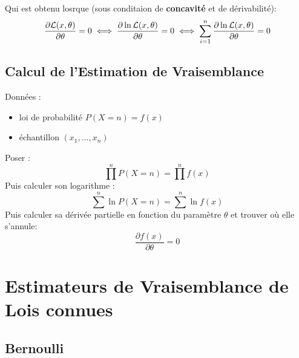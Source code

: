 \documentclass{article}
\begin{document}
Qui est obtenu losrque (sous conditaion de \textbf{concavité} et de dérivabilité):
\begin{equation}
    \frac{\partial {\cal L}(x, \theta)}{\partial \theta} = 0
    \iff \frac{\partial \ln{\cal L}(x, \theta)}{\partial \theta} = 0
    \iff \sum\limits_{i=1}^n \frac{\partial \ln {\cal L}(x, \theta)}{\partial \theta} = 0
\end{equation}


\subsection{Calcul de l'Estimation de Vraisemblance}
Données : 
\begin{itemize}
    \item loi de probabilité $P(X = n) = f(x)$
    \item échantillon $(x_1, ..., x_n)$
\end{itemize}
Poser :
\begin{equation}
    \prod\limits^n P(X = n) = \prod\limits^n f(x)
\end{equation}
Puis calculer son logarithme :
\begin{equation}
    \sum\limits^n \ln P(X = n) = \sum\limits^n \ln f(x)
\end{equation}
Puis calculer sa dérivée partielle en fonction du paramètre $\theta$ et trouver où elle s'annule:
\begin{equation}
    \frac{\partial f(x)}{\partial \theta} = 0
\end{equation}



\section{Estimateurs de Vraisemblance de Lois connues}

\subsection{Bernoulli}
\end{document}
